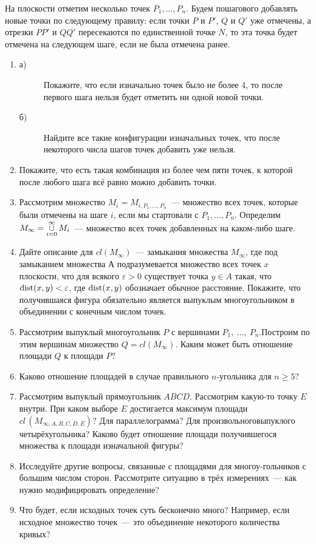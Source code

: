  На плоскости отметим несколько точек $P_1,\dots, P_n$. Будем пошагового добавлять новые точки по следующему правилу:
если точки $P$ и $P'$, $Q$ и $Q'$ уже отмечены, а отрезки $PP'$ и $QQ'$ пересекаются по единственной точке $N$, то эта точка будет отмечена на следующем шаге, если не была отмечена ранее.
\begin{enumerate}
\item
\begin{description}
\item[а)] Покажите, что если изначально точек было не более 4, то после первого шага нельзя будет отметить ни одной новой точки.
\item[б)] Найдите все такие конфигурации изначальных точек, что после некоторого числа шагов точек добавить уже нельзя.
\end{description}

\item Покажите, что есть такая комбинация из более чем пяти точек, к которой после любого шага всё равно можно добавить точки.
\item Рассмотрим множество $M_i=M_{i, P_1,\dots, P_n}$~— множество всех точек, которые были отмечены на шаге $i$, если мы стартовали с $P_1,\dots, P_n$. Определим $M_{\infty}=\mathop{\cup}\limits_{i=0}^{\infty} M_i$~— множество всех точек добавленных на каком-либо шаге.
\item Дайте описание для $cl(M_{\infty})$~— замыкания множества $M_{\infty}$, где под замыканием множества А подразумевается множество всех точек $x$ плоскости, что для всякого $\varepsilon>0$ существует точка $y\in A$ такая, что $\operatorname{dist}(x, y)<\varepsilon$, где $\operatorname{dist}(x,y)$ обозначает обычное расстояние. Покажите, что получившаяся фигура обязательно является выпуклым многоугольником в объединении с конечным числом точек.
\item Рассмотрим выпуклый многоугольник $P$ с вершинами $P_1,\ \ldots,\ P_n$.\linebreak Построим по этим вершинам множество $Q=cl(M_{\infty})$. Каким может быть отношение площади $Q$ к площади $P$?
\item Каково отношение площадей в случае правильного $n$-угольника для $n\geq 5$?
\item Рассмотрим выпуклый прямоугольник $ABCD$. Рассмотрим какую-\linebreak то точку $E$ внутри. При каком выборе $E$ достигается максимум площади $cl\,(M_{\infty,A,B,C,D,E})$? Для параллелограмма? Для произвольного\linebreak выпуклого четырёхугольника? Каково будет отношение площади получившегося множества к площади изначальной фигуры?
\item Исследуйте другие вопросы, связанные с площадями для многоу-\linebreak гольников с большим числом сторон. Рассмотрите ситуацию в трёх измерениях~— как нужно модифицировать определение?
\item Что будет, если исходных точек суть бесконечно много? Например, если исходное множество точек~— это объединение некоторого количества кривых?

\end{enumerate}



